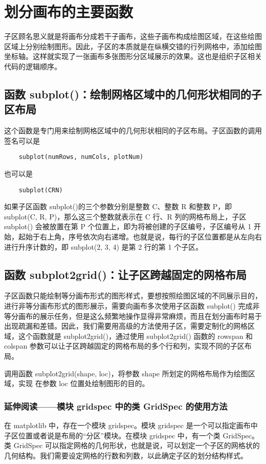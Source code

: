 \chapter{划分画布的主要函数}
子区顾名思义就是将画布分成若干子画布，这些子画布构成绘图区域，在这些绘图区域上分别绘制图形。因此，子区的本质就是在纵横交错的行列网格中，添加绘图坐标轴。这样就实现了一张画布多张图形分区域展示的效果。这也是组织子区相关代码的逻辑顺序。
\section{函数 subplot()：绘制网格区域中的几何形状相同的子区布局}
这个函数是专门用来绘制网格区域中的几何形状相同的子区布局。子区函数的调用签名可以是
\begin{verbatim}
    subplot(numRows, numCols, plotNum)
\end{verbatim}
也可以是
\begin{verbatim}
    subplot(CRN)
\end{verbatim}
如果子区函数 subplot()的三个参数分别是整数 C、整数 R 和整数 P，即 subplot(C, R, P)，那么这三个整数就表示在 C 行、R 列的网格布局上，子区 subplot() 会被放置在第 P 个位置上，即为将被创建的子区编号，子区编号从 1 开始，起始于右上角，序号依次向右递增。也就是说，每行的子区位置都是从左向右进行升序计数的，即 subplot(2, 3, 4) 是第 2 行的第 1 个子区。
\section{函数 subplot2grid()：让子区跨越固定的网格布局}
子区函数只能绘制等分画布形式的图形样式，要想按照绘图区域的不同展示目的，进行非等分画布形式的图形展示，需要向画布多次使用子区函数 subplot() 完成非等分画布的展示任务，但是这么频繁地操作显得非常麻烦，而且在划分画布时易于出现疏漏和差错。因此，我们需要用高级的方法使用子区，需要定制化的网格区域，这个函数就是 subplot2grid()，通过使用 subplot2grid() 函数的 rowspan 和 colspan 参数可以让子区跨越固定的网格布局的多个行和列，实现不同的子区布局。

调用函数 subplot2grid(shape, loc)，将参数 shape 所划定的网格布局作为绘图区域，实现 在参数 loc 位置处绘制图形的目的。
\subsection{延伸阅读——模块 gridspec 中的类 GridSpec 的使用方法}
在 matplotlib 中，存在一个模块 gridspec。模块 gridspec 是一个可以指定画布中子区位置或者说是布局的“分区”模块。在模块 gridspec 中，有一个类 GridSpec。类 GridSpec 可以指定网格的几何形状，也就是说，可以划定一个子区的网格状的几何结构。我们需要设定网格的行数和列数，以此确定子区的划分结构样式。
